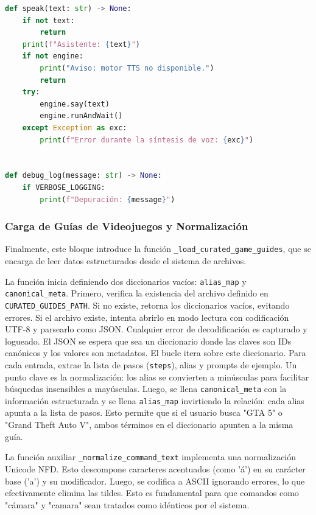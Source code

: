 \documentclass[letterpaper,12pt]{article}
\begin{document}
\begin{lstlisting}[language=Python, caption=Constantes de Conocimiento e Inicialización de Clientes]
def speak(text: str) -> None:
    if not text:
        return
    print(f"Asistente: {text}")
    if not engine:
        print("Aviso: motor TTS no disponible.")
        return
    try:
        engine.say(text)
        engine.runAndWait()
    except Exception as exc:
        print(f"Error durante la síntesis de voz: {exc}")


def debug_log(message: str) -> None:
    if VERBOSE_LOGGING:
        print(f"Depuración: {message}")
\end{lstlisting}

\subsubsection{Carga de Guías de Videojuegos y Normalización}

Finalmente, este bloque introduce la función \texttt{\_load\_curated\_game\_guides}, que se encarga de leer datos estructurados desde el sistema de archivos.

La función inicia definiendo dos diccionarios vacíos: \texttt{alias\_map} y \texttt{canonical\_meta}.
Primero, verifica la existencia del archivo definido en \texttt{CURATED\_GUIDES\_PATH}. Si no existe, retorna los diccionarios vacíos, evitando errores.
Si el archivo existe, intenta abrirlo en modo lectura con codificación UTF-8 y parsearlo como JSON. Cualquier error de decodificación es capturado y logueado.
El JSON se espera que sea un diccionario donde las claves son IDs canónicos y los valores son metadatos. El bucle itera sobre este diccionario.
Para cada entrada, extrae la lista de pasos (\texttt{steps}), alias y prompts de ejemplo. Un punto clave es la normalización: los alias se convierten a minúsculas para facilitar búsquedas insensibles a mayúsculas.
Luego, se llena \texttt{canonical\_meta} con la información estructurada y se llena \texttt{alias\_map} invirtiendo la relación: cada alias apunta a la lista de pasos. Esto permite que si el usuario busca "GTA 5" o "Grand Theft Auto V", ambos términos en el diccionario apunten a la misma guía.

La función auxiliar \texttt{\_normalize\_command\_text} implementa una normalización Unicode NFD. Esto descompone caracteres acentuados (como 'á') en su carácter base ('a') y su modificador. Luego, se codifica a ASCII ignorando errores, lo que efectivamente elimina las tildes. Esto es fundamental para que comandos como "cámara" y "camara" sean tratados como idénticos por el sistema.
\end{document}
